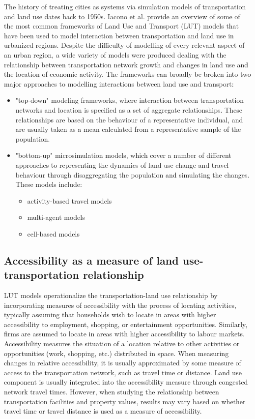 The history of treating cities as systems via simulation models of transportation and land use dates back to 1950s\cite{Batty2008}.
Iacono et al.
\cite{Iacono2008} provide an overview of some of the most common frameworks of Land Use and Transport (LUT) models that have been used to model interaction between transportation and land use in urbanized regions.
Despite the difficulty of modelling of every relevant aspect of an urban region, a wide variety of models were produced dealing with the relationship between transportation network growth and changes in land use and the location of economic activity.
The frameworks can broadly be broken into two major approaches to modelling interactions between land use and transport:
\begin{itemize}
    \item "top-down" modeling frameworks, where interaction between transportation networks and location is specified as a set of aggregate relationships.
    These relationships are based on the behaviour of a representative individual, and are usually taken as a mean calculated from a representative sample of the population.
    \item "bottom-up" microsimulation models, which cover a number of different approaches to representing the dynamics of land use change and travel behaviour through disaggregating the population and simulating the changes.
    These models include:
    \begin{itemize}
        \item activity-based travel models
        \item multi-agent models
        \item cell-based models
    \end{itemize}
\end{itemize}

\subsection{Accessibility as a measure of land use-transportation relationship} \label{subsec:accessibility}

LUT models operationalize the transportation-land use relationship by incorporating measures of accessibility with the process of locating activities, typically assuming that households wish to locate in areas with higher accessibility to employment, shopping, or entertainment opportunities.
Similarly, firms are assumed to locate in areas with higher accessibility to labour markets.
Accessibility measures the situation of a location relative to other activities or opportunities (work, shopping, etc.) distributed in space\cite{Iacono2008}.
When measuring changes in relative accessibility, it is usually approximated by some measure of access to the transportation network, such as travel time or distance.
Land use component is usually integrated into the accessibility measure through congested network travel times.
However, when studying the relationship between transportation facilities and property values, results may vary based on whether travel time or travel distance is used as a measure of accessibility\cite{Sherry1999}.

